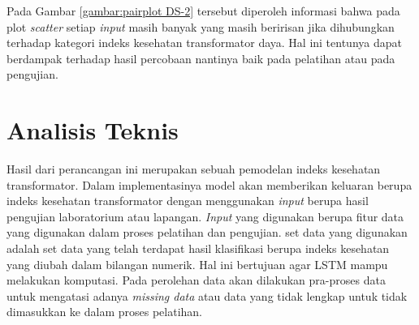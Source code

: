 Pada Gambar \ref{gambar:pairplot DS-2} tersebut diperoleh informasi bahwa pada plot \textit{scatter} setiap \textit{input} masih banyak yang masih beririsan jika dihubungkan terhadap kategori indeks kesehatan transformator daya. Hal ini tentunya dapat berdampak terhadap hasil percobaan nantinya baik pada pelatihan atau pada pengujian. 




\section{Analisis Teknis}

Hasil dari perancangan ini merupakan sebuah pemodelan indeks kesehatan transformator. Dalam implementasinya model akan memberikan keluaran berupa indeks kesehatan transformator dengan menggunakan \textit{input} berupa hasil pengujian laboratorium atau lapangan. \textit{Input} yang digunakan berupa fitur data yang digunakan dalam proses pelatihan dan pengujian. set data yang digunakan adalah set data yang telah terdapat hasil klasifikasi berupa indeks kesehatan yang diubah dalam bilangan numerik. Hal ini bertujuan agar LSTM mampu melakukan komputasi. Pada perolehan data akan dilakukan pra-proses data untuk mengatasi adanya \textit{missing data} atau data yang tidak lengkap untuk tidak dimasukkan ke dalam proses pelatihan.


